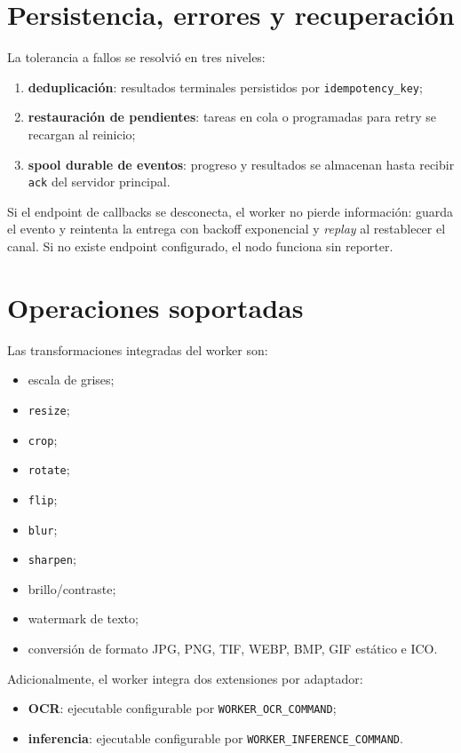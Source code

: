 \documentclass[conference]{IEEEtran}
\begin{document}
\section{Persistencia, errores y recuperación}
La tolerancia a fallos se resolvió en tres niveles:
\begin{enumerate}[leftmargin=*]
\item \textbf{deduplicación}: resultados terminales persistidos por \texttt{idempotency\_key};
\item \textbf{restauración de pendientes}: tareas en cola o programadas para retry se recargan al reinicio;
\item \textbf{spool durable de eventos}: progreso y resultados se almacenan hasta recibir \texttt{ack} del servidor principal.
\end{enumerate}

Si el endpoint de callbacks se desconecta, el worker no pierde información: guarda el evento y reintenta la entrega con backoff exponencial y \emph{replay} al restablecer el canal. Si no existe endpoint configurado, el nodo funciona sin reporter.

\section{Operaciones soportadas}
Las transformaciones integradas del worker son:
\begin{itemize}[leftmargin=*]
\item escala de grises;
\item \texttt{resize};
\item \texttt{crop};
\item \texttt{rotate};
\item \texttt{flip};
\item \texttt{blur};
\item \texttt{sharpen};
\item brillo/contraste;
\item watermark de texto;
\item conversión de formato JPG, PNG, TIF, WEBP, BMP, GIF estático e ICO.
\end{itemize}

Adicionalmente, el worker integra dos extensiones por adaptador:
\begin{itemize}[leftmargin=*]
\item \textbf{OCR}: ejecutable configurable por \texttt{WORKER\_OCR\_COMMAND};
\item \textbf{inferencia}: ejecutable configurable por \texttt{WORKER\_INFERENCE\_COMMAND}.
\end{itemize}
\end{document}
